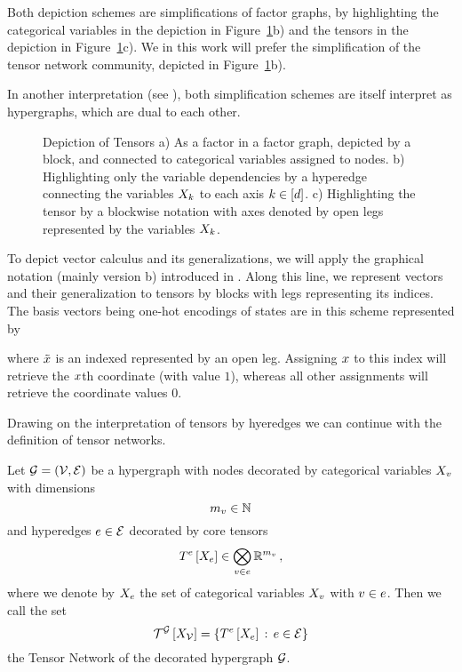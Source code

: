 Both depiction schemes are simplifications of factor graphs, by highlighting the categorical variables in the depiction in Figure~\ref{fig:tensors}b) and the tensors in the depiction in Figure~\ref{fig:tensors}c).
We in this work will prefer the simplification of the tensor network community, depicted in Figure~\ref{fig:tensors}b).

In another interpretation (see \cite{robeva_duality_2019}), both simplification schemes are itself interpret as hypergraphs, which are dual to each other.

\begin{figure}[h!]
	\begin{center}
		
	\end{center}
	\caption{Depiction of Tensors 
	a) As a factor in a factor graph, depicted by a block, and connected to categorical variables assigned to nodes.
	b) Highlighting only the variable dependencies by a hyperedge connecting the variables $X_{k}$ to each axis $k\in[d]$.
	c) Highlighting the tensor by a blockwise notation with axes denoted by open legs represented by the variables $X_{k}$.
	}\label{fig:tensors}
\end{figure}


To depict vector calculus and its generalizations, we will apply the graphical notation (mainly version b) introduced in .
Along this line, we represent vectors and their generalization to tensors by blocks with legs representing its indices.
The basis vectors being one-hot encodings of states are in this scheme represented by
	\begin{center}
		
	\end{center}
where $\tilde{x}$ is an indexed represented by an open leg. 
Assigning $x$ to this index will retrieve the $x$th coordinate (with value $1$), whereas all other assignments will retrieve the coordinate values $0$. 


Drawing on the interpretation of tensors by hyeredges we can continue with the definition of tensor networks.

\begin{definition}\label{def:tensorNetwork}
	Let $\mathcal{G}=(\mathcal{V},\mathcal{E})$ be a hypergraph with nodes decorated by categorical variables $X_{v}$ with dimensions
		\[ m_{v} \in \mathbb{N} \]	
	and hyperedges $e\in\mathcal{E}$ decorated by core tensors
		\[ T^{e}\left[X_{e}\right] \in \bigotimes_{v\in e}\mathbb{R}^{m_{v}} \, , \]
	where we denote by $X_{e}$ the set of categorical variables $X_{v}$ with $v\in e$.
	Then we call the set 
		\[ \mathcal{T}^{\mathcal{G}}\left[X_{\mathcal{V}}\right] = \{T^{e}\left[X_{e}\right]  \, : \, e\in\mathcal{E}\} \]
	the Tensor Network of the decorated hypergraph $\mathcal{G}$.
\end{definition}


